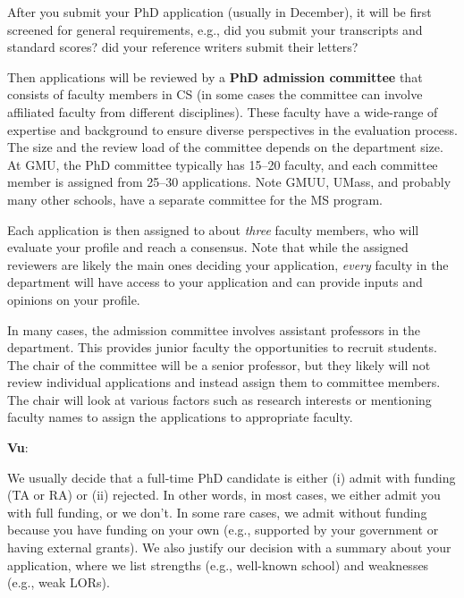 \documentclass[11pt]{article}
\newenvironment{commentbox}[1][]{
\small
    \begin{cbox}
    \textbf{#1}: 
 }{
   \end{cbox}
}
\newcommand{\mycomment}[3][\color{blue}]{{#1{{#2}: {#3}}}}
\newcommand{\didi}[1]{\mycomment{Didier}{#1}}{}
\begin{document}
After you submit your PhD application (usually in December), it will be first screened
for general requirements, e.g., did you submit your transcripts and standard scores? did your reference writers submit their letters?

Then applications will be reviewed by a
\textbf{PhD admission committee} that consists of faculty members in CS (in some cases the committee can involve affiliated faculty from different disciplines). These faculty have a wide-range of expertise and background to ensure diverse perspectives in the evaluation process. The size and the review load of the committee depends on the department size. At GMU, the PhD committee typically has 15--20 faculty, and each committee member is assigned from 25--30 applications. Note GMUU, UMass, and probably many other schools, have a separate committee for the MS program.

Each application is then assigned to about \emph{three} faculty members, who will evaluate your profile and reach a consensus.  Note that while the assigned reviewers are likely the main ones deciding your application, \emph{every} faculty in the department will have access to your application and can provide inputs and opinions on your profile.

In many cases, the admission committee involves assistant professors in the department. This provides junior faculty the opportunities to recruit students. The chair of the committee will be a senior professor, but they likely will not review individual applications and instead assign them to committee members. The chair will look at various factors such as research interests or mentioning faculty names to assign the applications to appropriate faculty. 

\begin{commentbox}[Vu] 
We usually decide that a full-time PhD candidate is either (i) admit with funding (TA or RA) or (ii) rejected. In other words, in most cases, we either
admit you with full funding, or we don't. In some rare cases, we admit
without funding because you have funding on your own (e.g.,
supported by your government or having external grants). We also justify
our decision with a summary about your application, where we list
strengths (e.g., well-known school) and weaknesses (e.g., weak
LORs). 
\end{commentbox}

\end{document}
